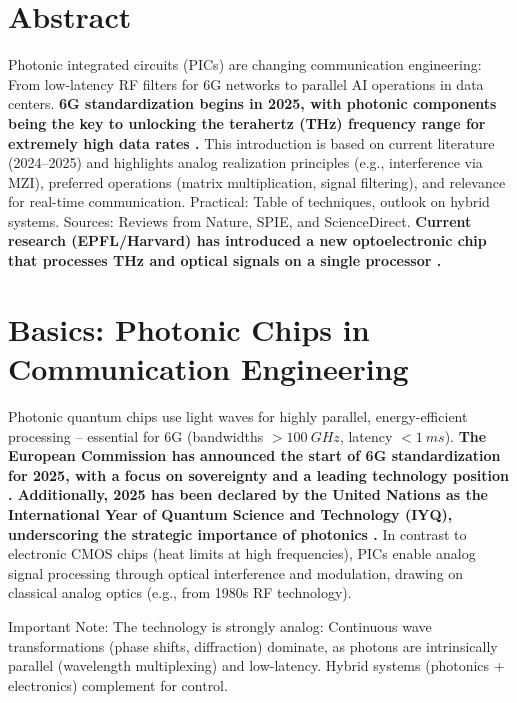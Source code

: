 \section*{Abstract}
		Photonic integrated circuits (PICs) are changing communication engineering: From low-latency RF filters for 6G networks to parallel AI operations in data centers. \textbf{6G standardization begins in 2025, with photonic components being the key to unlocking the terahertz (THz) frequency range for extremely high data rates \cite{6g_roadmap}.} This introduction is based on current literature (2024--2025) and highlights analog realization principles (e.g., interference via MZI), preferred operations (matrix multiplication, signal filtering), and relevance for real-time communication. Practical: Table of techniques, outlook on hybrid systems. Sources: Reviews from Nature, SPIE, and ScienceDirect. \textbf{Current research (EPFL/Harvard) has introduced a new optoelectronic chip that processes THz and optical signals on a single processor \cite{thz_epfl}.}

	
	
	\section{Basics: Photonic Chips in Communication Engineering}
	
	Photonic quantum chips use light waves for highly parallel, energy-efficient processing -- essential for 6G (bandwidths $>\SI{100}{GHz}$, latency $<\SI{1}{ms}$). \textbf{The European Commission has announced the start of 6G standardization for 2025, with a focus on sovereignty and a leading technology position \cite{6g_roadmap}. Additionally, 2025 has been declared by the United Nations as the International Year of Quantum Science and Technology (IYQ), underscoring the strategic importance of photonics \cite{quantenjahr25}.} In contrast to electronic CMOS chips (heat limits at high frequencies), PICs enable analog signal processing through optical interference and modulation, drawing on classical analog optics (e.g., from 1980s RF technology).
	
	\begin{important}
		Important Note: The technology is strongly analog: Continuous wave transformations (phase shifts, diffraction) dominate, as photons are intrinsically parallel (wavelength multiplexing) and low-latency. Hybrid systems (photonics + electronics) complement for control.
	\end{important}
	
